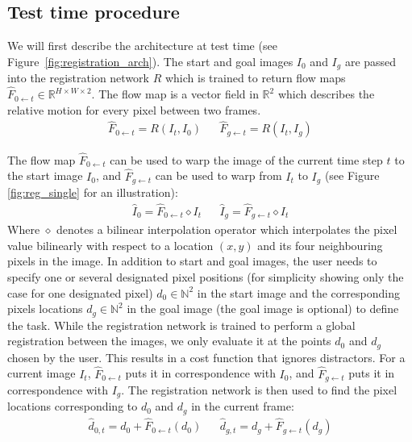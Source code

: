 \subsection{Test time procedure}

We will first describe the architecture at test time (see Figure~\ref{fig:registration_arch}). The start and goal images $I_0$ and $I_g$ are passed into the registration network $R$ which is trained to return flow maps $\hat{F}_{0 \leftarrow t} \in \mathbb{R}^{H \times W \times 2}$. The flow map is a vector field in $\mathbb{R}^2$ which describes the relative motion for every pixel between two frames.
\begin{align}
    \hat{F}_{0 \leftarrow t} = R(I_t, I_0) &&
    \hat{F}_{g \leftarrow t} = R(I_t, I_g)
\end{align}

The flow map $\hat{F}_{0 \leftarrow t}$ can be used to warp the image of the current time step $t$ to the start image $I_0$, and $\hat{F}_{g \leftarrow t}$ can be used to warp from $I_t$ to $I_g$ (see Figure \ref{fig:reg_single} for an illustration):
\begin{align}
    \hat{I}_0 = \hat{F}_{0 \leftarrow t} \diamond  I_t &&
    \hat{I}_g = \hat{F}_{g \leftarrow t} \diamond  I_t 
\end{align}
Where $\diamond$ denotes a bilinear interpolation operator which interpolates the pixel value bilinearly with respect to a location $(x,y)$ and its four neighbouring pixels in the image.
In addition to start and goal images, the user needs to specify one or several designated pixel positions (for simplicity showing only the case for one designated pixel) $d_0 \in \mathbb{N}^2$ in the start image and the corresponding pixels locations $d_g \in \mathbb{N}^2$ in the goal image (the goal image is optional) to define the task. While the registration network is trained to perform a global registration between the images, we only evaluate it at the points $d_0$ and $d_g$ chosen by the user. This results in a cost function that ignores distractors. For a current image $I_t$, $\hat{F}_{0 \leftarrow t}$ puts it in correspondence with $I_0$, and $\hat{F}_{g \leftarrow t}$ puts it in correspondence with $I_g$. The registration network is then used to find the pixel locations corresponding to $d_0$ and $d_g$ in the current frame: 
\begin{align}
    \hat{d}_{0,t} = d_0 + \hat{F}_{0 \leftarrow t}(d_0) &&
    \hat{d}_{g,t} = d_g + \hat{F}_{g \leftarrow t}(d_g)
    \label{eqn:warped_pos}
\end{align}

